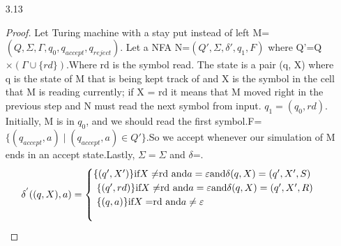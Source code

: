 \documentclass[10pt] {article}
\begin{document}
\begin{enumerate}
\begin{proof}
\begin{enumerate}
\begin{enumerate}
\item If the next symbol is marked unmark it, RESET, and move right to the second
tape cell changing the state of $M_{LR}$ to q' and go to (1).
\item If the second cell is not marked repeat the following loop:
\begin{enumerate}
\item RESET. Move right to the first marked cell. Unmark it and move right.
\item Mark the current cell and move right.
\item If the cell is unmarked return to (i).
\item Otherwise unmark it and RESET.
\item Move right back to the first marked cell. Move right and change the state of
$M_{LR}$ to q' and go to (1).
\end{enumerate}
\end{enumerate}
\item[4.] If q'
is the accept state of M, accept. If q' is the reject state of M, reject."
\end{enumerate}
Since $M_{LR}$ emulates the transitions of M and only accepts or rejects when M does.Therefore $L(M)=L(M_{LR})$, and a Turing machine with a left reset recognizes the class of Turing-recognizable languages.
\end{proof}
\item[3.13]\begin{proof}
 Let Turing machine with a stay put instead of left M=$(Q,\Sigma,\Gamma,q_0,q_{accept},q_{reject})$. Let a NFA N=$(Q',\Sigma,\delta',q_1,F)$ where
Q'=Q$\times (\Gamma \cup \{ rd \})$.Where rd is the symbol read. The state is a pair (q, X) where q is the state of M that is being kept track of and X is the symbol in the cell that M is reading currently; if X = rd it means that M moved right in the previous step and N must read the next symbol from input. $q_1=(q_0,rd).$Initially, M is in $q_0$, and we should read the first symbol.F=$\{(q_{accept},a) \mid (q_{accept},a) \in Q' \}$.So we accept whenever our simulation of M ends in an accept state.Lastly, $\Sigma = \Sigma$ and $\delta$=.
\[
  \delta^{'}((q,X),a)=\begin{cases}
               \{(q',X')\} $if$ X \neq $rd and$ a = \varepsilon $and$ \delta(q,X)=(q',X',S) \\\
                \{(q',rd)\} $if$ X \neq $rd and$ a = \varepsilon $and$ \delta(q,X)=(q',X',R) \\\
                  \{(q,a)\} $if$ X = $rd and$ a \neq \varepsilon \\\

\end{cases}\]
\end{proof}
\end{enumerate}
\end{document}
